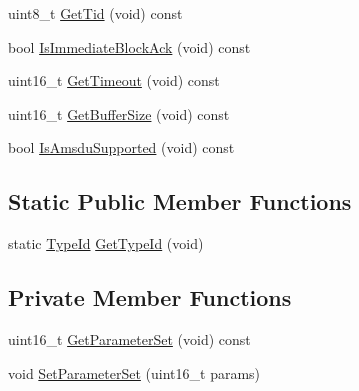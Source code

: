\begin{DoxyCompactItemize}
\item 
uint8\+\_\+t \hyperlink{classns3_1_1MgtAddBaResponseHeader_a643b70f2e86aa454c58d2d807bcccde7}{Get\+Tid} (void) const 
\item 
bool \hyperlink{classns3_1_1MgtAddBaResponseHeader_a3dceb717f201736574b322d6245ac00f}{Is\+Immediate\+Block\+Ack} (void) const 
\item 
uint16\+\_\+t \hyperlink{classns3_1_1MgtAddBaResponseHeader_a6cf6c014d9634ef17568d9c8395f1d6b}{Get\+Timeout} (void) const 
\item 
uint16\+\_\+t \hyperlink{classns3_1_1MgtAddBaResponseHeader_adaec25030095902533000b047acfa20e}{Get\+Buffer\+Size} (void) const 
\item 
bool \hyperlink{classns3_1_1MgtAddBaResponseHeader_a89a9baf019ce6b0ed4e4de80bd3ba24b}{Is\+Amsdu\+Supported} (void) const 
\end{DoxyCompactItemize}
\subsection*{Static Public Member Functions}
\begin{DoxyCompactItemize}
\item 
static \hyperlink{classns3_1_1TypeId}{Type\+Id} \hyperlink{classns3_1_1MgtAddBaResponseHeader_a1646edc89671b7f6795092be64a91c7f}{Get\+Type\+Id} (void)
\end{DoxyCompactItemize}
\subsection*{Private Member Functions}
\begin{DoxyCompactItemize}
\item 
uint16\+\_\+t \hyperlink{classns3_1_1MgtAddBaResponseHeader_a6401f26e0496f9e438c928bd30c95d92}{Get\+Parameter\+Set} (void) const 
\item 
void \hyperlink{classns3_1_1MgtAddBaResponseHeader_a4d947e5ada055f71bd1963a58c8e878d}{Set\+Parameter\+Set} (uint16\+\_\+t params)
\end{DoxyCompactItemize}
